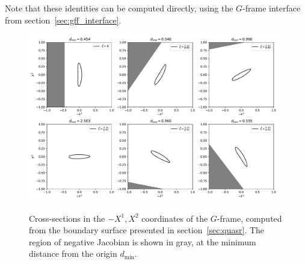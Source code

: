 \documentclass[12pt]{iopart}
\newcommand\hladdedrev[1]{#1} %
\newcommand\hlchangedrev[1]{#1} %
\newcommand\ddp[2]{\frac{\partial #1}{\partial #2}}
\newcommand\Nnew{{\bm N}}
\newcommand\Bnew{{\bm B}}
\newcommand\GFF{$G$-frame}
\newcommand\ttilde{{\tilde{\bm T}_q}}
\begin{document}

\hlchangedrev{Note that these identities can be computed directly, using the \GFF{} interface from section~\ref{sec:gff_interface}.}

\begin{figure}[htbp!]
    \centering
    \includegraphics[trim=0 10 0 0,clip,width=0.98\textwidth]{pics/quasr/quasr_Jlimits.pdf}\\
    \caption{\hladdedrev{Cross-sections in the $-X^1,X^2$ coordinates of the \GFF{}, computed from the boundary surface presented in section~\ref{sec:quasr}. The region of negative Jacobian is shown in gray, at the minimum distance from the origin $d_\text{min}$.}}
    \label{fig:quasr_Jlimits}
\end{figure}
\end{document}
